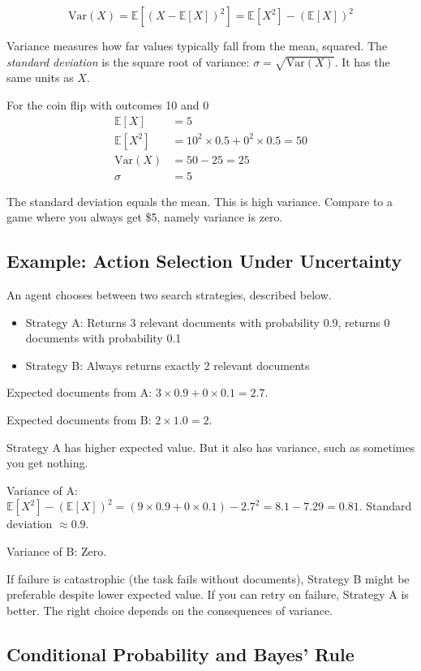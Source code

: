 \[
\text{Var}(X) = \mathbb{E}[(X - \mathbb{E}[X])^2] = \mathbb{E}[X^2] - (\mathbb{E}[X])^2
\]

Variance measures how far values typically fall from the mean, squared. The \textit{standard deviation} is the square root of variance: $\sigma = \sqrt{\text{Var}(X)}$. It has the same units as $X$.

For the coin flip with outcomes 10 and 0
\begin{align*}
\mathbb{E}[X] &= 5 \\
\mathbb{E}[X^2] &= 10^2 \times 0.5 + 0^2 \times 0.5 = 50 \\
\text{Var}(X) &= 50 - 25 = 25 \\
\sigma &= 5
\end{align*}

The standard deviation equals the mean. This is high variance. Compare to a game where you always get \$5, namely variance is zero.

\subsection{Example: Action Selection Under Uncertainty}

An agent chooses between two search strategies, described below.
\begin{itemize}
\item Strategy A: Returns 3 relevant documents with probability 0.9, returns 0 documents with probability 0.1
\item Strategy B: Always returns exactly 2 relevant documents
\end{itemize}

Expected documents from A: $3 \times 0.9 + 0 \times 0.1 = 2.7$.

Expected documents from B: $2 \times 1.0 = 2$.

Strategy A has higher expected value. But it also has variance, such as sometimes you get nothing.

Variance of A: $\mathbb{E}[X^2] - (\mathbb{E}[X])^2 = (9 \times 0.9 + 0 \times 0.1) - 2.7^2 = 8.1 - 7.29 = 0.81$. Standard deviation $\approx 0.9$.

Variance of B: Zero.

If failure is catastrophic (the task fails without documents), Strategy B might be preferable despite lower expected value. If you can retry on failure, Strategy A is better. The right choice depends on the consequences of variance.

\subsection{Conditional Probability and Bayes' Rule}

